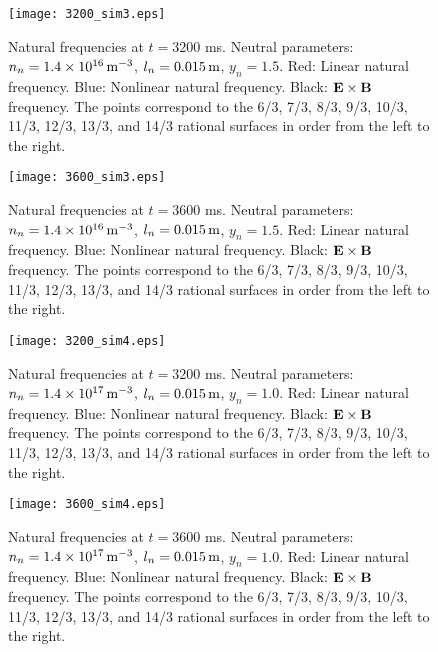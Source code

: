 \documentclass[12pt]{article}
\begin{document}
\begin{figure}
\centering
\texttt{[image: 3200\_sim3.eps]}
\caption{Natural frequencies at $t=3200$ ms. Neutral parameters: $n_n= 1.4\times 10^{16}\,{\rm m}^{-3}$, $l_n= 0.015\,{\rm m}$, $y_n=1.5$. Red: Linear natural frequency. Blue: Nonlinear natural frequency. Black: ${\bf E}\times {\bf B}$ frequency. The points correspond to the
6/3, 7/3, 8/3, 9/3, 10/3, 11/3, 12/3, 13/3, and 14/3 rational surfaces in order from the left to the right.}\label{fig6}
\end{figure}

\begin{figure}
\centering
\texttt{[image: 3600\_sim3.eps]}
\caption{Natural frequencies at $t=3600$ ms. Neutral parameters: $n_n= 1.4\times 10^{16}\,{\rm m}^{-3}$, $l_n= 0.015\,{\rm m}$, $y_n=1.5$. Red: Linear natural frequency. Blue: Nonlinear natural frequency. Black: ${\bf E}\times {\bf B}$ frequency. The points correspond to the
6/3, 7/3, 8/3, 9/3, 10/3, 11/3, 12/3, 13/3, and 14/3 rational surfaces in order from the left to the right.}\label{fig7}
\end{figure}

\begin{figure}
\centering
\texttt{[image: 3200\_sim4.eps]}
\caption{Natural frequencies at $t=3200$ ms. Neutral parameters: $n_n= 1.4\times 10^{17}\,{\rm m}^{-3}$, $l_n= 0.015\,{\rm m}$, $y_n=1.0$. Red: Linear natural frequency. Blue: Nonlinear natural frequency. Black: ${\bf E}\times {\bf B}$ frequency. The points correspond to the
6/3, 7/3, 8/3, 9/3, 10/3, 11/3, 12/3, 13/3, and 14/3 rational surfaces in order from the left to the right.}\label{fig8}
\end{figure}

\begin{figure}
\centering
\texttt{[image: 3600\_sim4.eps]}
\caption{Natural frequencies at $t=3600$ ms. Neutral parameters: $n_n= 1.4\times 10^{17}\,{\rm m}^{-3}$, $l_n= 0.015\,{\rm m}$, $y_n=1.0$. Red: Linear natural frequency. Blue: Nonlinear natural frequency. Black: ${\bf E}\times {\bf B}$ frequency. The points correspond to the
6/3, 7/3, 8/3, 9/3, 10/3, 11/3, 12/3, 13/3, and 14/3 rational surfaces in order from the left to the right.}\label{fig9}
\end{figure}
\end{document}
